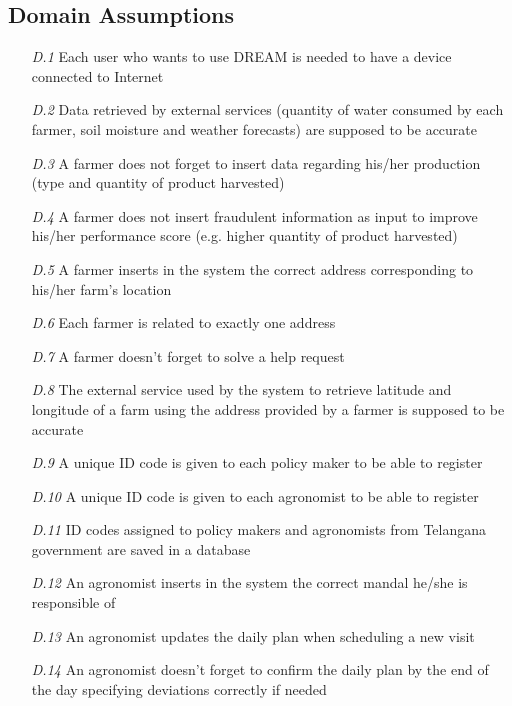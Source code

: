 \subsection{Domain Assumptions}

\begin{itemize}
    \item [\textit{D.1}] Each user who wants to use DREAM is needed to have a device connected to Internet 
    \item [\textit{D.2}] Data retrieved by external services (quantity of water consumed by each farmer, soil moisture and weather forecasts) are supposed to be accurate 
    \item [\textit{D.3}] A farmer does not forget to insert data regarding his/her production (type and quantity of product harvested)
    \item [\textit{D.4}] A farmer does not insert fraudulent information as input to  improve his/her performance score (e.g. higher quantity of product harvested)
    \item [\textit{D.5}] A farmer inserts in the system the correct address
    corresponding to his/her farm's location
    \item [\textit{D.6}] Each farmer is related to exactly one address
    \item [\textit{D.7}] A farmer doesn't forget to solve a help request
    \item [\textit{D.8}]The external service used by the system to retrieve latitude and longitude of a farm using the address provided by a farmer is supposed to be accurate
    \item [\textit{D.9}] A unique ID code is given to each policy maker to be able to register
    \item [\textit{D.10}] A unique ID code is given to each agronomist to be able to register
    \item [\textit{D.11}] ID codes assigned to policy makers and agronomists from Telangana government are saved in a database
    \item [\textit{D.12}] An agronomist inserts in the system the correct mandal he/she is responsible of
    \item [\textit{D.13}] An agronomist updates the daily plan when scheduling a new visit
    \item [\textit{D.14}] An agronomist doesn't forget to confirm the daily plan by the end of the day specifying deviations correctly if needed
\end{itemize}

